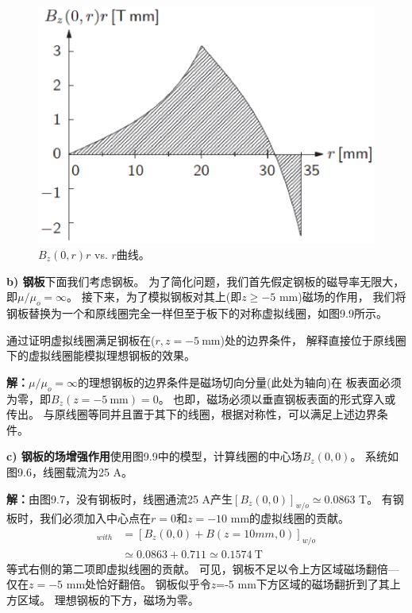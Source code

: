 \begin{figure}
	\centering
	\includegraphics[scale=0.6]{chpt9/figs/fig9.8.eps}
	\caption{$B_z(0,r)r$ vs. $r$曲线。}
\end{figure}

\textbf{b) 钢板}\qquad 下面我们考虑钢板。
为了简化问题，我们首先假定钢板的磁导率无限大，即$\mu/\mu_o=\infty$。
接下来，为了模拟钢板对其上(即$z\ge -5$ mm)磁场的作用，
我们将钢板替换为一个和原线圈完全一样但至于板下的对称虚拟线圈，如图9.9所示。

通过证明虚拟线圈满足钢板在($r,z=-5\ \mathrm{mm}$)处的边界条件，
解释直接位于原线圈下的虚拟线圈能模拟理想钢板的效果。

\textbf{解：}$\mu/\mu_o=\infty$的理想钢板的边界条件是磁场切向分量(此处为轴向)在
板表面必须为零，即$B_z(z=-5\ \mathrm{mm})=0$。
也即，磁场必须以垂直钢板表面的形式穿入或传出。
与原线圈等同并且置于其下的线圈，根据对称性，可以满足上述边界条件。

\textbf{c) 钢板的场增强作用}\qquad 使用图9.9中的模型，计算线圈的中心场$B_z(0,0)$。
系统如图9.6，线圈载流为25 A。

\textbf{解：}由图9.7，没有钢板时，线圈通流25 A产生$[B_z(0,0)]_{w/o}\simeq 0.0863$ T。
有钢板时，我们必须加入中心点在$r=0$和$z=-10$ mm的虚拟线圈的贡献。
\begin{align*}%
[B_{z}(0,0)]_{with}&=[B_{z}(0,0)+B(z=10mm,0)]_{w/o}\\
&\simeq 0.0863+0.711\simeq 0.1574\ \mathrm{T}
\end{align*}
等式右侧的第二项即虚拟线圈的贡献。
可见，钢板不足以令上方区域磁场翻倍---仅在$z=-5$ mm处恰好翻倍。
钢板似乎令$z$=-5 mm下方区域的磁场翻折到了其上方区域。
理想钢板的下方，磁场为零。


